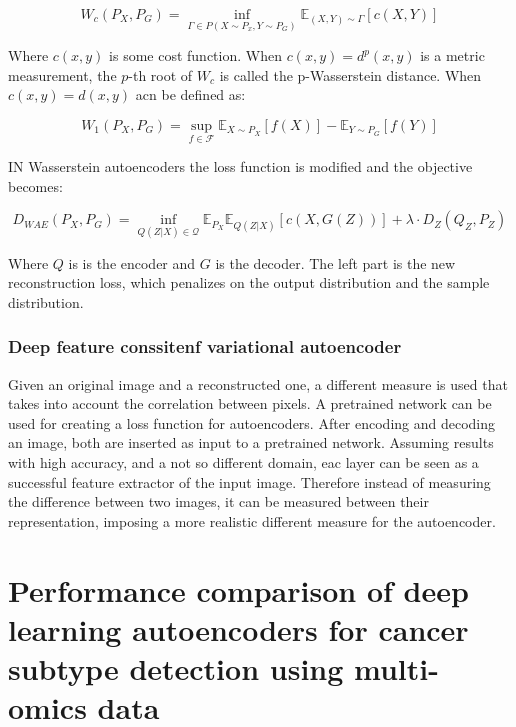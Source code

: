 			$$W_c(P_X, P_G) = \inf\limits_{\Gamma\in P(X\sim P_x, Y\sim P_G)}\mathbb{E}_{(X, Y)\sim\Gamma}[c(X, Y)]$$

			Where $c(x, y)$ is some cost function.
			When $c(x,y) = d^p(x, y)$ is a metric measurement, the $p$-th root of $W_c$ is called the p-Wasserstein distance.
			When $c(x, y) = d(x, y)$ acn be defined as:

			$$W_1(P_X, P_G) = \sup\limits_{f\in\mathcal{F}} \mathbb{E}_{X\sim P_X}[f(X)] - \mathbb{E}_{Y\sim P_G}[f(Y)]$$

			IN Wasserstein autoencoders the loss function is modified and the objective becomes:

			$$D_{WAE}(P_X, P_G) = \inf\limits_{Q(Z|X)\in\mathcal{Q}}\mathbb{E}_{P_X}\mathbb{E}_{Q(Z|X)}[c(X, G(Z))] + \lambda\cdot D_Z(Q_Z, P_Z)$$

			Where $Q$ is is the encoder and $G$ is the decoder.
			The left part is the new reconstruction loss, which penalizes on the output distribution and the sample distribution.

		\subsubsection{Deep feature conssitenf variational autoencoder}
		Given an original image and a reconstructed one, a different measure is used that takes into account the correlation between pixels.
		A pretrained network can be used for creating a loss function for autoencoders.
		After encoding and decoding an image, both are inserted as input to a pretrained network.
		Assuming results with high accuracy, and a not so different domain, eac layer can be seen as a successful feature extractor of the input image.
		Therefore instead of measuring the difference between two images, it can be measured between their representation, imposing a more realistic different measure for the autoencoder.

\section{Performance comparison of deep learning autoencoders for cancer subtype detection using multi-omics data}

